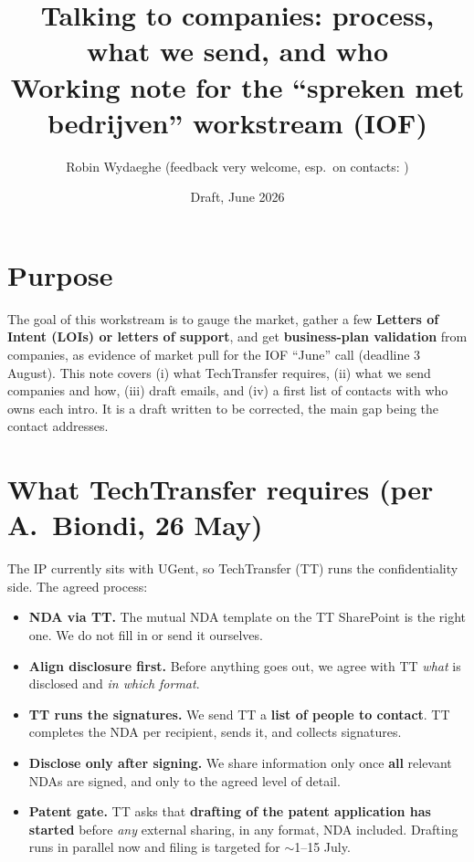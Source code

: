 \documentclass[11pt,a4paper]{article}
\title{\vspace{-1.5em}Talking to companies: process, what we send, and who\\[-0.2em]
\large Working note for the ``spreken met bedrijven'' workstream (IOF)}
\author{Robin Wydaeghe \quad (feedback very welcome, esp.\ on contacts: \owner{Luc} \owner{Wout})}
\date{Draft, June 2026}
\begin{document}
\maketitle
\vspace{-1.5em}

\section{Purpose}
The goal of this workstream is to gauge the market, gather a few \textbf{Letters of Intent (LOIs) or
letters of support}, and get \textbf{business-plan validation} from companies, as evidence of market pull
for the IOF ``June'' call (deadline 3 August). This note covers (i) what TechTransfer requires, (ii) what we
send companies and how, (iii) draft emails, and (iv) a first list of contacts with who owns each intro. It is
a draft written to be corrected, the main gap being the contact addresses.

\section{What TechTransfer requires (per A.\ Biondi, 26 May)}
The IP currently sits with UGent, so TechTransfer (TT) runs the confidentiality side. The agreed process:
\begin{itemize}
  \item \textbf{NDA via TT.} The mutual NDA template on the TT SharePoint is the right one. We do not fill in or send it ourselves.
  \item \textbf{Align disclosure first.} Before anything goes out, we agree with TT \emph{what} is disclosed and \emph{in which format}.
  \item \textbf{TT runs the signatures.} We send TT a \textbf{list of people to contact}. TT completes the NDA per recipient, sends it, and collects signatures.
  \item \textbf{Disclose only after signing.} We share information only once \textbf{all} relevant NDAs are signed, and only to the agreed level of detail.
  \item \textbf{Patent gate.} TT asks that \textbf{drafting of the patent application has started} before \emph{any} external sharing, in any format, NDA included. Drafting runs in parallel now and filing is targeted for $\sim$1--15 July.
\end{itemize}
\end{document}
